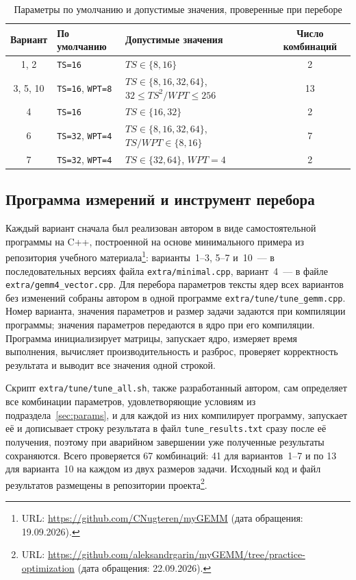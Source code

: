\documentclass[a4paper]{article}
\begin{document}
\begin{table}[h!]
\centering
\caption{Параметры по умолчанию и допустимые значения, проверенные при переборе}
\label{tab:params}
\begin{tabular}{c l l c}
\toprule
Вариант & По умолчанию & Допустимые значения & Число комбинаций \\
\midrule
1, 2      & \texttt{TS=16}                 & $TS \in \{8, 16\}$                                 & 2 \\
3, 5, 10  & \texttt{TS=16}, \texttt{WPT=8} & $TS \in \{8, 16, 32, 64\}$, $32 \le TS^2/WPT \le 256$ & 13 \\
4         & \texttt{TS=16}                 & $TS \in \{16, 32\}$                                & 2 \\
6         & \texttt{TS=32}, \texttt{WPT=4} & $TS \in \{8, 16, 32, 64\}$, $TS/WPT \in \{8, 16\}$  & 7 \\
7         & \texttt{TS=32}, \texttt{WPT=4} & $TS \in \{32, 64\}$, $WPT = 4$                     & 2 \\
\bottomrule
\end{tabular}
\end{table}

\subsection{Программа измерений и инструмент перебора}

Каждый вариант сначала был реализован автором в виде самостоятельной
программы на C++, построенной на основе минимального примера из
репозитория учебного материала\footnote{URL: \url{https://github.com/CNugteren/myGEMM}
(дата обращения: 19.09.2026).}: варианты~1--3, 5--7 и~10~--- в
последовательных версиях файла \texttt{extra/minimal.cpp}, вариант~4~---
в файле \texttt{extra/gemm4\_vector.cpp}. Для перебора параметров тексты
ядер всех вариантов без изменений собраны автором в одной программе
\texttt{extra/tune/tune\_gemm.cpp}. Номер варианта, значения
параметров и размер задачи задаются при компиляции программы;
значения параметров передаются в ядро при его компиляции. Программа
инициализирует матрицы, запускает ядро, измеряет время выполнения,
вычисляет производительность и разброс, проверяет корректность
результата и выводит все значения одной строкой.

Скрипт \texttt{extra/tune/tune\_all.sh}, также разработанный автором,
сам определяет все комбинации параметров, удовлетворяющие условиям из
подраздела~\ref{sec:params}, и для каждой из них компилирует программу,
запускает её и дописывает строку результата в файл
\texttt{tune\_results.txt} сразу после её получения, поэтому при
аварийном завершении уже полученные результаты сохраняются. Всего
проверяется 67 комбинаций: 41 для вариантов~1--7 и по 13 для
варианта~10 на каждом из двух размеров задачи. Исходный код и файл
результатов размещены в репозитории
проекта\footnote{URL: \url{https://github.com/aleksandrgarin/myGEMM/tree/practice-optimization}
(дата обращения: 22.09.2026).}.
\end{document}
